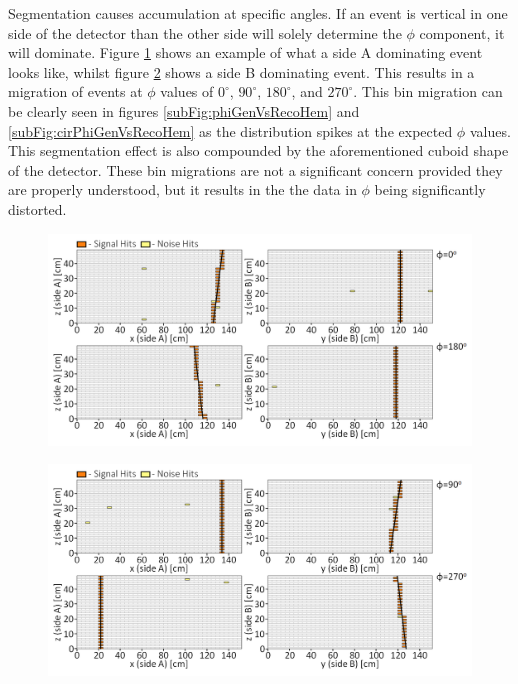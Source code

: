 Segmentation causes accumulation at specific angles. If an event is vertical in one side of the detector than the other side will solely determine the $\phi$ component, it will dominate. Figure  \ref{fig:cosmicBinMigrationSideA} shows an example of what a side A dominating event looks like, whilst figure \ref{fig:cosmicBinMigrationSideB} shows a side B dominating event. This results in a migration of events at $\phi$ values of $0^\circ$, $90^\circ$, $180^\circ$, and $270^\circ$. This bin migration can be clearly seen in figures \ref{subFig:phiGenVsRecoHem} and \ref{subFig:cirPhiGenVsRecoHem} as the distribution spikes at the expected $\phi$ values. This segmentation effect is also compounded by the aforementioned cuboid shape of the detector. These bin migrations are not a significant concern provided they are properly understood, but it results in the the data in $\phi$ being significantly distorted.  
 
\begin{figure}[!h]
 \centering
 \includegraphics[width=\linewidth]{Chapter6/Figs/Raster/phiSideABinMigrationMedText.png}
 \label{fig:cosmicBinMigrationSideA}
\end{figure}

\begin{figure}[!h]
 \centering
 \includegraphics[width=\linewidth]{Chapter6/Figs/Raster/phiSideBBinMigrationMedText.png}
 \label{fig:cosmicBinMigrationSideB}
\end{figure}

